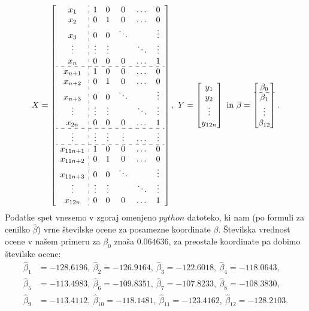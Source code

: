\documentclass{article}
\begin{document}
$$
X= \left[\begin{array}{c:ccccc}
    x_1 & 1 & 0 & 0 & \dots & 0 \\
    x_2 & 0 & 1 & 0 & \dots & 0 \\
    x_3 & 0 & 0 & \ddots & & \vdots \\
    \vdots & \vdots & \vdots & & \ddots & \vdots \\
    x_{n} & 0 & 0 & 0 & \dots & 1 \\
    \hdashline
    x_{n+1} & 1 & 0 & 0 & \dots & 0 \\
    x_{n+2} & 0 & 1 & 0 & \dots & 0 \\
    x_{n+3} & 0 & 0 & \ddots & & \vdots \\
    \vdots & \vdots & \vdots & & \ddots&\vdots \\
    x_{2n} & 0 & 0 & 0 & \dots & 1\\
    \hdashline
    \vdots & \vdots & \vdots & \vdots & \dots&\vdots\\
    \hdashline
    x_{11n+1} & 1 & 0 & 0 & \dots & 0 \\
    x_{11n+2} & 0 & 1 & 0 & \dots & 0 \\
    x_{11n+3} & 0 & 0 & \ddots & & \vdots \\
    \vdots & \vdots & \vdots & & \ddots&\vdots \\
    x_{12n} & 0 & 0 & 0 & \dots & 1 \\
\end{array}\right], ~
    Y = \begin{bmatrix}
        y_1 \\ 
        y_2 \\
        \vdots \\ 
        y_{12n}
    \end{bmatrix}~\text{in}~ 
    \beta = \begin{bmatrix}
        \beta_0 \\ 
        \hdashline
        \beta_1 \\ 
        \vdots \\ 
        \beta_{12}
    \end{bmatrix}.   
$$
Podatke spet vnesemo v zgoraj omenjeno $python$ datoteko, ki nam (po formuli za cenilko $\hat{\beta}$) vrne številske ocene za posamezne koordinate $\beta$.
Številska vrednost ocene v našem primeru za $\beta_0$ znaša $0.064636$, za preostale koordinate pa dobimo številske ocene:
\begin{equation*}
\begin{split}
    \hat{\beta}_1 &= -128.6196,~\hat{\beta}_2 = -126.9164,~\hat{\beta}_3 = -122.6018,~\hat{\beta}_4 = -118.0643,\\
    \hat{\beta}_5  &= -113.4983,~\hat{\beta}_6 = -109.8351,~\hat{\beta}_7 = -107.8233,~\hat{\beta}_8 = -108.3830,\\
    \hat{\beta}_9 &= -113.4112,~\hat{\beta}_{10} = -118.1481,~\hat{\beta}_{11} = -123.4162,~\hat{\beta}_{12} = -128.2103.
\end{split}
\end{equation*}
\end{document}
